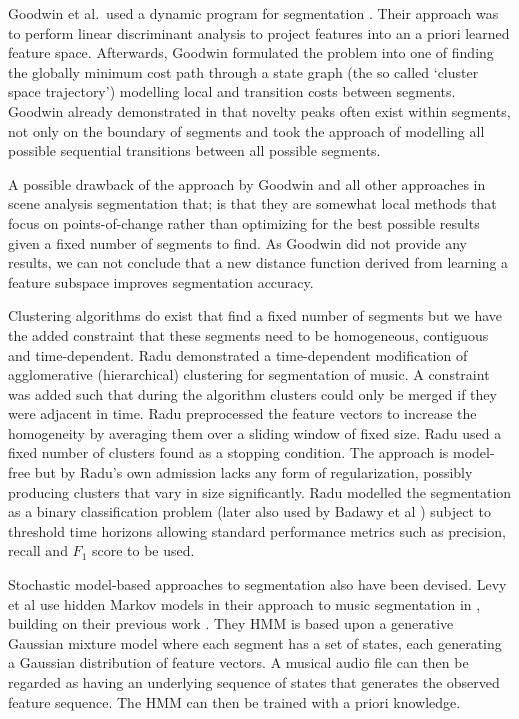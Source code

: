 \documentclass[twocolumn]{article}
\begin{document}
	Goodwin et al.\ used a dynamic program for segmentation \citep{goodwin2004dynamic}. Their approach was to perform linear discriminant analysis to project features into an a priori learned feature space. Afterwards, Goodwin formulated the problem into one of finding the globally minimum cost path through a state graph (the so called `cluster space trajectory') modelling local and transition costs between segments. Goodwin already demonstrated in \citep{goodwin2003audio} that novelty peaks often exist within segments, not only on the boundary of segments and took the approach of modelling all possible sequential transitions between all possible segments.
	
	A possible drawback of the approach by Goodwin and all other approaches in scene analysis segmentation that; is that they are somewhat local methods that focus on points-of-change rather than optimizing for the best possible results given a fixed number of segments to find. As Goodwin did not provide any results, we can not conclude that a new distance function derived from learning a feature subspace improves segmentation accuracy. 
	
	Clustering algorithms do exist that find a fixed number of segments but we have the added constraint that these segments need to be homogeneous, contiguous and time-dependent. Radu \citep{radu} demonstrated a time-dependent modification of agglomerative (hierarchical) clustering for segmentation of music. A constraint was added such that during the algorithm clusters could only be merged if they were adjacent in time. Radu preprocessed the feature vectors to increase the homogeneity by averaging them over a sliding window of fixed size. Radu used a fixed number of clusters found as a stopping condition. The approach is model-free but by Radu's own admission lacks any form of regularization, possibly producing clusters that vary in size significantly. Radu modelled the segmentation as a binary classification problem (later also used by Badawy et al \citep{elaudio}) subject to threshold time horizons allowing standard performance metrics such as precision, recall and $F_1$ score to be used. 
	
	Stochastic model-based approaches to segmentation also have been devised. Levy et al use hidden Markov models in their approach to music segmentation in \citep{levy2008structural}, building on their previous work \citep{levy2006new, levy2006extraction}. They HMM is based upon a generative Gaussian mixture model where each segment has a set of states, each generating a Gaussian distribution of feature vectors. A musical audio file can then be regarded as having an underlying sequence of states that generates the observed feature sequence. The HMM can then be trained with a priori knowledge. 
	
\end{document}

